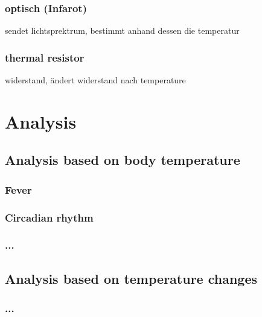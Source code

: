 \subsubsection{optisch (Infarot)}
sendet lichtsprektrum, bestimmt anhand dessen die temperatur

\subsubsection{thermal resistor}
 widerstand, ändert widerstand nach temperature
 
\section{Analysis}
\subsection{Analysis based on body temperature}
\subsubsection{Fever}
\subsubsection{Circadian rhythm}
\subsubsection{...}

\subsection{Analysis based on temperature changes}
\subsubsection{...}